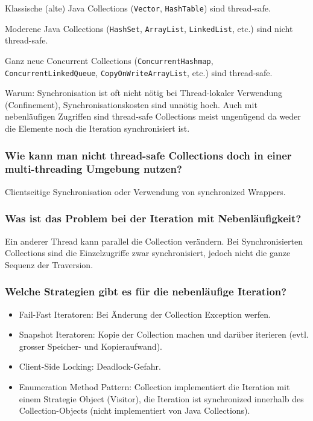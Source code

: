 \documentclass[10pt,a4paper]{scrartcl}
\begin{document}
Klassische (alte) Java Collections (\texttt{Vector}, \texttt{HashTable}) sind thread-safe.

Moderene Java Collections (\texttt{HashSet}, \texttt{ArrayList}, \texttt{LinkedList}, etc.) sind
nicht thread-safe.

Ganz neue Concurrent Collections (\texttt{ConcurrentHashmap}, \texttt{ConcurrentLinkedQueue},
\texttt{CopyOnWriteArrayList}, etc.) sind thread-safe. 

Warum: Synchronisation ist oft nicht nötig bei Thread-lokaler Verwendung (Confinement),
Synchronisationskosten sind unnötig hoch. Auch mit nebenläufigen Zugriffen sind thread-safe
Collections meist ungenügend da weder die Elemente noch die Iteration synchronisiert ist.
  
\subsubsection{Wie kann man nicht thread-safe Collections doch in einer multi-threading Umgebung nutzen?}

Clientseitige Synchronisation oder Verwendung von synchronized Wrappers.

\subsubsection{Was ist das Problem bei der Iteration mit Nebenläufigkeit?}

Ein anderer Thread kann parallel die Collection verändern. Bei Synchronisierten Collections sind
die Einzelzugriffe zwar synchronisiert, jedoch nicht die ganze Sequenz der Traversion.
  
\subsubsection{Welche Strategien gibt es für die nebenläufige Iteration?}

\begin{itemize}
	\item Fail-Fast Iteratoren: Bei Änderung der Collection Exception werfen.
	\item Snapshot Iteratoren: Kopie der Collection machen und darüber iterieren (evtl. grosser
		Speicher- und Kopieraufwand).
	\item Client-Side Locking: Deadlock-Gefahr.
	\item Enumeration Method Pattern: Collection implementiert die Iteration mit einem Strategie
		Object (Visitor), die Iteration ist synchronized innerhalb des Collection-Objects (nicht
		implementiert von Java Collections).
\end{itemize}
\end{document}

